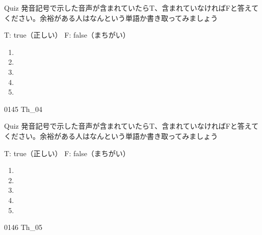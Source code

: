\documentclass[aspectratio=169, xcolor={dvipsnames,table}]{beamer}
\begin{document}
\begin{frame}[plain]{Quiz }
  \large 発音記号で示した音声が含まれていたらT、含まれていなければFと答えてください。余裕がある人はなんという単語か書き取ってみましょう

  \hfill{}{\scriptsize T: true（正しい）\hspace{5pt} F: false（まちがい）}
  \begin{enumerate}
    \item \mbox{}\hspace{1\zw}

    \item \mbox{}\hspace{1\zw}

    \item \mbox{}\hspace{1\zw}

    \item \mbox{}\hspace{1\zw}

    \item \mbox{}\hspace{1\zw}
  \end{enumerate}

  \hfill{\tiny 0145}\,{\scriptsize {}}\,{\tiny Th\_04}
\end{frame}
\begin{frame}[plain]{Quiz}
  \large 発音記号で示した音声が含まれていたらT、含まれていなければFと答えてください。余裕がある人はなんという単語か書き取ってみましょう

  \hfill{}{\scriptsize T: true（正しい）\hspace{5pt} F: false（まちがい）}
  \begin{enumerate}
    \item \mbox{}\hspace{1\zw}

    \item \mbox{}\hspace{1\zw}

    \item \mbox{}\hspace{1\zw}

    \item \mbox{}\hspace{1\zw}

    \item \mbox{}\hspace{1\zw}
  \end{enumerate}

  \hfill{\tiny 0146}\,{\scriptsize {}}\,{\tiny Th\_05}
\end{frame}
\end{document}
